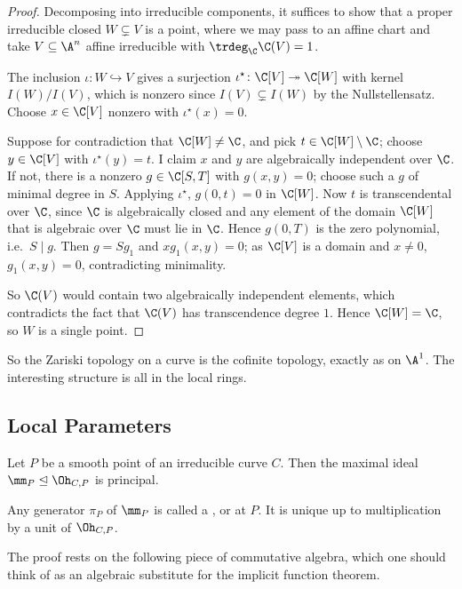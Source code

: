 \begin{proof}
	Decomposing into irreducible components, it suffices to show that a proper irreducible closed $W \subsetneq V$ is a point, where we may pass to an affine chart and take $V \subseteq \A^n$ affine irreducible with $\trdeg_\C \C(V) = 1$.

	The inclusion $\iota \colon W \hookrightarrow V$ gives a surjection $\iota^\star \colon \C[V] \twoheadrightarrow \C[W]$ with kernel $I(W)/I(V)$, which is nonzero since $I(V) \subsetneq I(W)$ by the Nullstellensatz. Choose $x \in \C[V]$ nonzero with $\iota^\star(x) = 0$.

	Suppose for contradiction that $\C[W] \neq \C$, and pick $t \in \C[W]\setminus\C$; choose $y \in \C[V]$ with $\iota^\star(y) = t$. I claim $x$ and $y$ are algebraically independent over $\C$. If not, there is a nonzero $g \in \C[S,T]$ with $g(x,y) = 0$; choose such a $g$ of minimal degree in $S$. Applying $\iota^\star$, $g(0,t) = 0$ in $\C[W]$. Now $t$ is transcendental over $\C$, since $\C$ is algebraically closed and any element of the domain $\C[W]$ that is algebraic over $\C$ must lie in $\C$. Hence $g(0,T)$ is the zero polynomial, i.e.\ $S \mid g$. Then $g = Sg_1$ and $xg_1(x,y) = 0$; as $\C[V]$ is a domain and $x \neq 0$, $g_1(x,y) = 0$, contradicting minimality.

	So $\C(V)$ would contain two algebraically independent elements, which contradicts the fact that $\C(V)$ has transcendence degree $1$. Hence $\C[W] = \C$, so $W$ is a single point.
\end{proof}

So the Zariski topology on a curve is the cofinite topology, exactly as on $\A^1$. The interesting structure is all in the local rings.

\subsection{Local Parameters}

\begin{theorem}\label{thm:localparam}
	Let $P$ be a smooth point of an irreducible curve $C$. Then the maximal ideal $\mm_P \trianglelefteq \Oh_{C,P}$ is principal.
\end{theorem}

Any generator $\pi_P$ of $\mm_P$ is called a ,  or  at $P$. It is unique up to multiplication by a unit of $\Oh_{C,P}$.

The proof rests on the following piece of commutative algebra, which one should think of as an algebraic substitute for the implicit function theorem.

